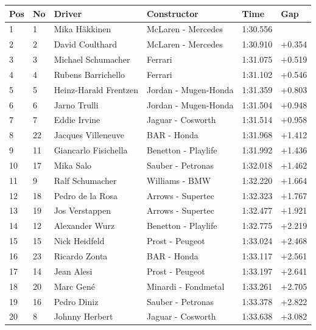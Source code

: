 \documentclass{article}
\begin{document}
\begin{tabular}{llllll}
\toprule
Pos & No & Driver & Constructor & Time & Gap \\
\midrule
1 & 1 & Mika Häkkinen & McLaren - Mercedes & 1:30.556 &  \\
2 & 2 & David Coulthard & McLaren - Mercedes & 1:30.910 & +0.354 \\
3 & 3 & Michael Schumacher & Ferrari & 1:31.075 & +0.519 \\
4 & 4 & Rubens Barrichello & Ferrari & 1:31.102 & +0.546 \\
5 & 5 & Heinz-Harald Frentzen & Jordan - Mugen-Honda & 1:31.359 & +0.803 \\
6 & 6 & Jarno Trulli & Jordan - Mugen-Honda & 1:31.504 & +0.948 \\
7 & 7 & Eddie Irvine & Jaguar - Cosworth & 1:31.514 & +0.958 \\
8 & 22 & Jacques Villeneuve & BAR - Honda & 1:31.968 & +1.412 \\
9 & 11 & Giancarlo Fisichella & Benetton - Playlife & 1:31.992 & +1.436 \\
10 & 17 & Mika Salo & Sauber - Petronas & 1:32.018 & +1.462 \\
11 & 9 & Ralf Schumacher & Williams - BMW & 1:32.220 & +1.664 \\
12 & 18 & Pedro de la Rosa & Arrows - Supertec & 1:32.323 & +1.767 \\
13 & 19 & Jos Verstappen & Arrows - Supertec & 1:32.477 & +1.921 \\
14 & 12 & Alexander Wurz & Benetton - Playlife & 1:32.775 & +2.219 \\
15 & 15 & Nick Heidfeld & Prost - Peugeot & 1:33.024 & +2.468 \\
16 & 23 & Ricardo Zonta & BAR - Honda & 1:33.117 & +2.561 \\
17 & 14 & Jean Alesi & Prost - Peugeot & 1:33.197 & +2.641 \\
18 & 20 & Marc Gené & Minardi - Fondmetal & 1:33.261 & +2.705 \\
19 & 16 & Pedro Diniz & Sauber - Petronas & 1:33.378 & +2.822 \\
20 & 8 & Johnny Herbert & Jaguar - Cosworth & 1:33.638 & +3.082 \\
\bottomrule
\end{tabular}
\end{document}
